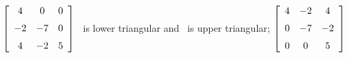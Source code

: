 {$\left[ \begin {array}{ccc} 4&0&0\\\noalign{\medskip}-2&-7&0
\\\noalign{\medskip}4&-2&5\end {array} \right] $} 
{\tta\ is lower triangular and \ttat\ is upper triangular; $\left[ \begin {array}{ccc} 4&-2&4\\\noalign{\medskip}0&-7&-2
\\\noalign{\medskip}0&0&5\end {array} \right] $}

 

